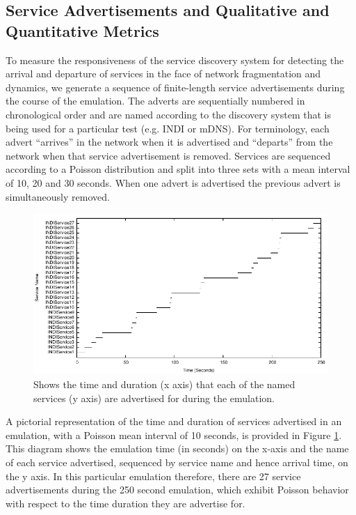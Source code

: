\subsection{Service Advertisements and Qualitative and Quantitative Metrics}

To measure the responsiveness of the service discovery system for detecting the arrival and departure of services in the face of network fragmentation and dynamics, we generate a sequence of finite-length service advertisements during the course of the emulation.  The adverts are sequentially numbered in chronological order and are named  according to the discovery system that is being used for a particular test (e.g. INDI or mDNS).   For terminology, each advert ``arrives'' in the network when it is advertised and ``departs'' from the network when that service advertisement is removed.    Services are sequenced according to a Poisson distribution and split into three sets with a mean interval of 10, 20 and 30 seconds.  When one advert is advertised the previous advert is simultaneously removed.  

\begin{figure}
\centering
\includegraphics[scale=1.0]{indi10advert-distribution.pdf}
\caption{Shows the time and duration (x axis) that each of the named services (y axis) are advertised for during the emulation.} 
\label{indi:fig:poisson-10-adverts}
\end{figure}

A pictorial representation of the time and duration of services advertised in an emulation, with a Poisson mean interval of 10 seconds, is provided in Figure \ref{indi:fig:poisson-10-adverts}. This diagram shows the emulation time (in seconds) on the x-axis and the name of each service advertised, sequenced by service name and hence arrival time, on the y axis.  In this particular emulation therefore, there are 27 service advertisements during the 250 second emulation, which exhibit Poisson behavior with respect to the time duration they are advertise for.   

